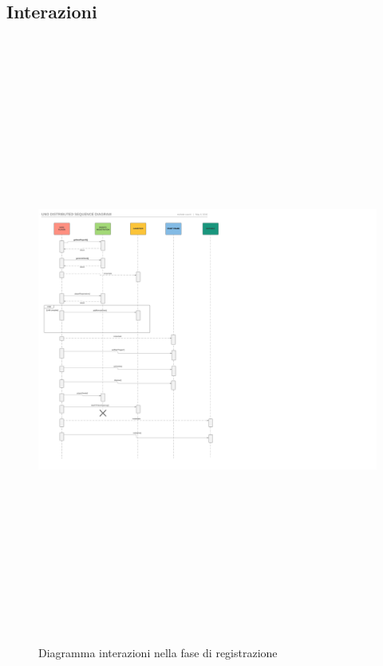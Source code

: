 \documentclass[10pt,a4paper]{article}
\begin{document}
\subsection{Interazioni}
\begin{figure}[H]
\begin{center}
\includegraphics[height=20cm, keepaspectratio]{registration.png}
\caption{Diagramma interazioni nella fase di registrazione}
\end{center}
\end{figure}
\end{document}
